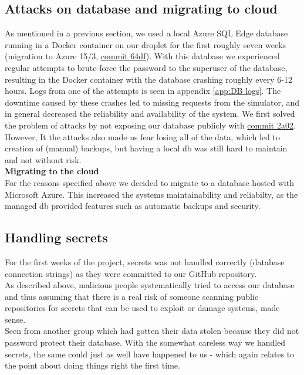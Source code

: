 \subsection{Attacks on database and migrating to cloud}
As mentioned in a previous section, we used a local Azure SQL Edge database running in a Docker container on our droplet for the first roughly seven weeks (migration to Azure 15/3, \href{https://github.com/Chillhound/DevOps2022F/commit/64df2d7b400a116b25d448e2005b062c0fb2bf72}{commit 64df}). With this database we experienced regular attempts to brute-force the password to the superuser of the database, resulting in the Docker container with the database crashing roughly every 6-12 hours. Logs from one of the attempts is seen in appendix \ref{app:DB logs}. The downtime caused by these crashes led to missing requests from the simulator, and in general decreased the reliability and availability of the system.  We first solved the problem of attacks by not exposing our database publicly with \href{https://github.com/Chillhound/DevOps2022F/commit/2a025f54d7694fb7f59eba496befc600e8bd7546}{commit 2a02}. However, It the attacks also made us fear losing all of the data, which led to creation of (manual) backups, but having a local db was still hard to maintain and not without risk.
\\
\textbf{Migrating to the cloud} \\
For the reasons specified above we decided to migrate to a database hosted with Microsoft Azure. This increased the systems maintainability and reliabilty, as the managed db provided features such as automatic backups and security. 


\subsection{Handling secrets}
For the first weeks of the project, secrets was not handled correctly (database connection strings) as they were committed to our GitHub repository. \\
As described above, malicious people systematically tried to access our database and thus assuming that there is a real risk of someone scanning public repositories for secrets that can be used to exploit or damage systems, made sense. \\
Seen from another group which had gotten their data stolen because they did not password protect their database.
With the somewhat careless way we handled secrets, the same could just as well have happened to us - which again relates to the point about doing things right the first time.

